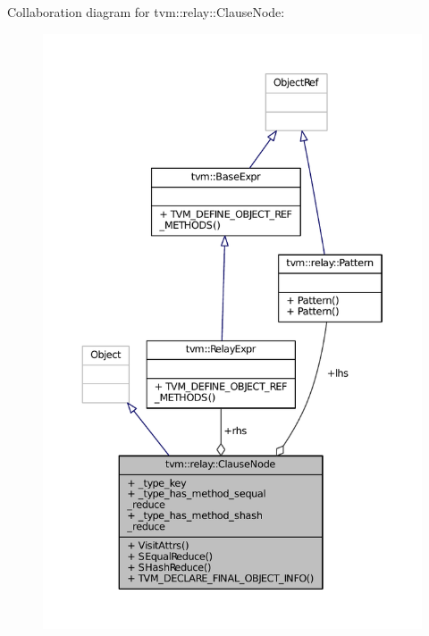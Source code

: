 Collaboration diagram for tvm\+:\+:relay\+:\+:Clause\+Node\+:
\nopagebreak
\begin{figure}[H]
\begin{center}
\leavevmode
\includegraphics[width=350pt]{classtvm_1_1relay_1_1ClauseNode__coll__graph}
\end{center}
\end{figure}
